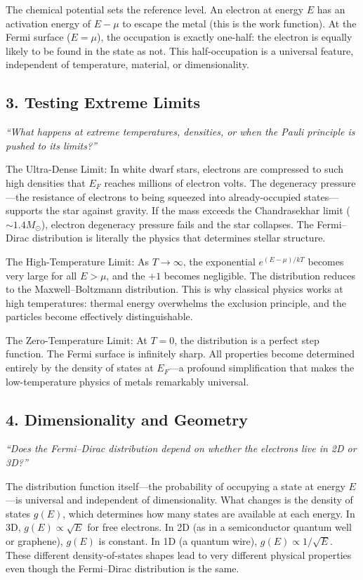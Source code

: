 \documentclass[11pt,openright]{book}
\begin{document}
The chemical potential sets the reference level. An electron at energy $E$ has an activation energy of $E - \mu$ to escape the metal (this is the work function). At the Fermi surface ($E = \mu$), the occupation is exactly one-half: the electron is equally likely to be found in the state as not. This half-occupation is a universal feature, independent of temperature, material, or dimensionality.

\subsection*{3. Testing Extreme Limits}
\textit{``What happens at extreme temperatures, densities, or when the Pauli principle is pushed to its limits?''}

The Ultra-Dense Limit: In white dwarf stars, electrons are compressed to such high densities that $E_F$ reaches millions of electron volts. The degeneracy pressure---the resistance of electrons to being squeezed into already-occupied states---supports the star against gravity. If the mass exceeds the Chandrasekhar limit ($\sim 1.4 M_\odot$), electron degeneracy pressure fails and the star collapses. The Fermi--Dirac distribution is literally the physics that determines stellar structure.

The High-Temperature Limit: As $T \to \infty$, the exponential $e^{(E-\mu)/kT}$ becomes very large for all $E > \mu$, and the $+1$ becomes negligible. The distribution reduces to the Maxwell--Boltzmann distribution. This is why classical physics works at high temperatures: thermal energy overwhelms the exclusion principle, and the particles become effectively distinguishable.

The Zero-Temperature Limit: At $T = 0$, the distribution is a perfect step function. The Fermi surface is infinitely sharp. All properties become determined entirely by the density of states at $E_F$---a profound simplification that makes the low-temperature physics of metals remarkably universal.

\subsection*{4. Dimensionality and Geometry}
\textit{``Does the Fermi--Dirac distribution depend on whether the electrons live in 2D or 3D?''}

The distribution function itself---the probability of occupying a state at energy $E$---is universal and independent of dimensionality. What changes is the density of states $g(E)$, which determines how many states are available at each energy. In 3D, $g(E) \propto \sqrt{E}$ for free electrons. In 2D (as in a semiconductor quantum well or graphene), $g(E)$ is constant. In 1D (a quantum wire), $g(E) \propto 1/\sqrt{E}$. These different density-of-states shapes lead to very different physical properties even though the Fermi--Dirac distribution is the same.
\end{document}
